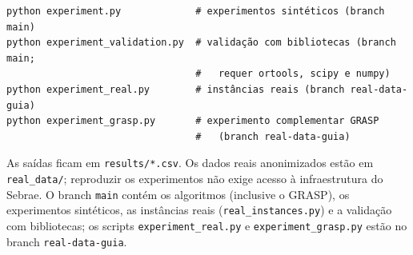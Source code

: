 \documentclass[12pt,a4paper]{article}
\begin{document}
\begin{singlespace}\small
\begin{verbatim}
python experiment.py             # experimentos sintéticos (branch main)
python experiment_validation.py  # validação com bibliotecas (branch main;
                                 #   requer ortools, scipy e numpy)
python experiment_real.py        # instâncias reais (branch real-data-guia)
python experiment_grasp.py       # experimento complementar GRASP
                                 #   (branch real-data-guia)
\end{verbatim}
\end{singlespace}
As saídas ficam em \texttt{results/*.csv}. Os dados reais anonimizados estão em \texttt{real\_data/}; reproduzir os experimentos não exige acesso à infraestrutura do Sebrae. O branch \texttt{main} contém os algoritmos (inclusive o GRASP), os experimentos sintéticos, as instâncias reais (\texttt{real\_instances.py}) e a validação com bibliotecas; os scripts \texttt{experiment\_real.py} e \texttt{experiment\_grasp.py} estão no branch \texttt{real-data-guia}.
\end{document}
